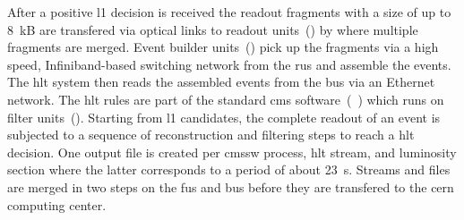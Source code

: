 After a positive \gls{l1} decision is received the readout fragments with a size of up to 8~kB are transfered via optical links to readout units~() by  where multiple fragments are merged. Event builder units~() pick up the fragments via a high speed, Infiniband-based switching network from the \glspl{ru} and assemble the events.
The \gls{hlt} system then reads the assembled events from the \glspl{bu} via an Ethernet network. The \gls{hlt} rules are part of the standard \gls{cms} software~(~\cite{Bayatian:922757}) which runs on filter units~(). Starting from \gls{l1} candidates, the complete readout of an event is subjected to a sequence of reconstruction and filtering steps to reach a \gls{hlt} decision. One output file is created per \gls{cmssw} process, \gls{hlt} stream, and luminosity section where the latter corresponds to a period of about 23~s. Streams and files are merged in two steps on the \glspl{fu} and \glspl{bu} before they are transfered to the \gls{cern} computing center.
